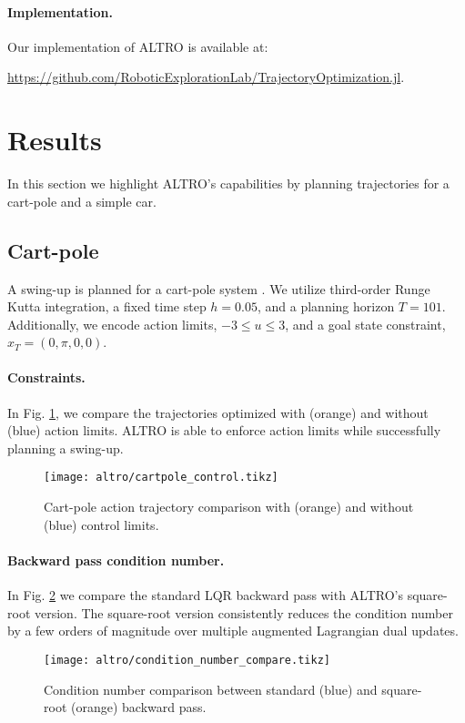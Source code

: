 \paragraph{Implementation.}
Our implementation of ALTRO is available at:
\begin{center}
\url{https://github.com/RoboticExplorationLab/TrajectoryOptimization.jl}.
\end{center}

\section{Results} \label{altro_results}
In this section we highlight ALTRO's capabilities by planning trajectories for a cart-pole and a simple car.

\subsection{Cart-pole}
A swing-up is planned for a cart-pole system \cite{tedrake2014underactuated}. We utilize third-order Runge Kutta integration, a fixed time step $h = 0.05$, and a planning horizon $T = 101$. Additionally, we encode action limits, $-3 \leq u \leq 3$, and a goal state constraint, $x_T = (0, \pi, 0, 0)$.

\paragraph{Constraints.}
In Fig. \ref{altro_control_limits}, we compare the trajectories optimized with (orange) and without (blue) action limits. ALTRO is able to enforce action limits while successfully planning a swing-up.
\begin{figure}[H]
	\begin{center}
		\texttt{[image: altro/cartpole\_control.tikz]}
	\end{center}
	\caption[Action trajectory comparison for cart-pole with control limits]{Cart-pole action trajectory comparison with (orange) and without (blue) control limits.}
	\label{altro_control_limits}
\end{figure}

\paragraph{Backward pass condition number.}
In Fig. \ref{altro_bp_condition_number} we compare the standard LQR backward pass with ALTRO's square-root version. The square-root version consistently reduces the condition number by a few orders of magnitude over multiple augmented Lagrangian dual updates.
\begin{figure}[H]
	\begin{center}
		\texttt{[image: altro/condition\_number\_compare.tikz]}
	\end{center}
	\caption[Condition number comparison between standard and square-root backward pass]{Condition number comparison between standard (blue) and square-root (orange) backward pass.}
	\label{altro_bp_condition_number}
\end{figure}

